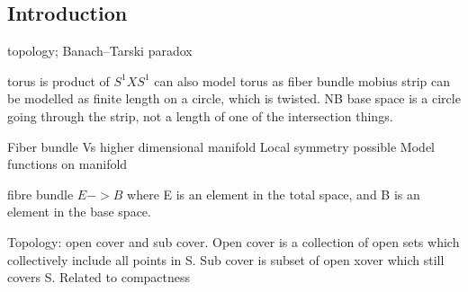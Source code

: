 
\subsection{Introduction}

topology;
	Banach–Tarski paradox

torus is product of \(S^1 X S^1\)
can also model torus as fiber bundle
mobius strip can be modelled as finite length on a circle, which is twisted. NB base space is a circle going through the strip, not a length of one of the intersection things.

Fiber bundle Vs higher dimensional manifold
Local symmetry possible
Model functions on manifold

fibre bundle
\(E->B\)
where E is an element in the total space, and B is an element in the base space.

Topology: open cover and sub cover. Open cover is a collection of open sets which collectively include all points in S. Sub cover is subset of open xover which still covers S. Related to compactness


